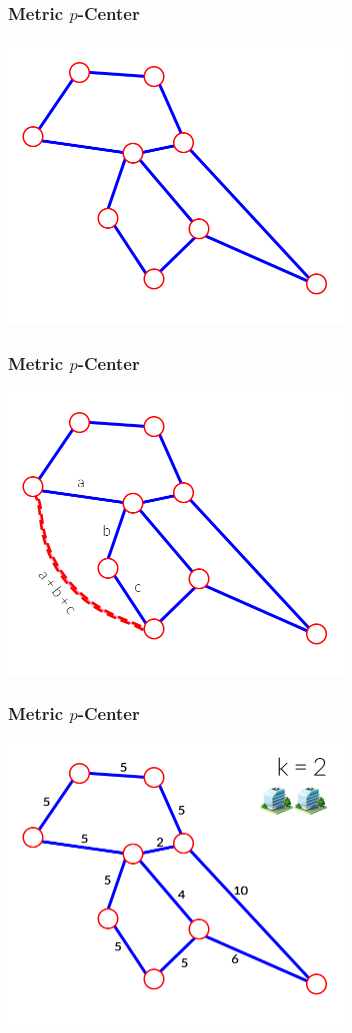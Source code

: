 \documentclass[12pt]{beamer}
\begin{document}
\begin{frame}
\frametitle{Metric $p$-Center}
\begin{center}
\includegraphics[height=75mm]{Images/metric1}\\
\end{center}
\end{frame}
\begin{frame}
\frametitle{Metric $p$-Center}
\begin{center}
\includegraphics[height=75mm]{Images/metric2}\\
\end{center}
\end{frame}
\begin{frame}
\frametitle{Metric $p$-Center}
\begin{center}
\includegraphics[height=75mm]{Images/metric3}\\
\end{center}
\end{frame}
\end{document}
